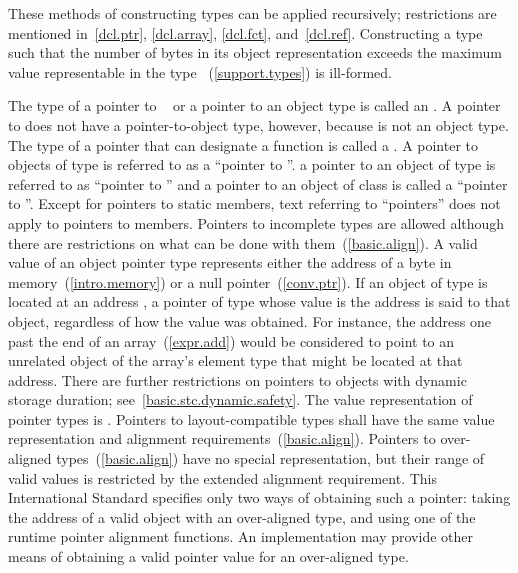 \pnum
These methods of constructing types can be applied recursively;
restrictions are mentioned in~\ref{dcl.ptr}, \ref{dcl.array},
\ref{dcl.fct}, and~\ref{dcl.ref}. Constructing a type such that the number of
bytes in its object representation exceeds the maximum value representable in
the type ~(\ref{support.types}) is ill-formed.

\pnum
{}%
The type of a pointer to \cv\  or a pointer to an object type is
called an . \enternote A pointer to 
does not have a pointer-to-object type, however, because  is not
an object type. \exitnote The type of a pointer that can designate a function
is called a .
A pointer to objects of type  is referred to as a ``pointer to
''. \enterexample a pointer to an object of type  is
referred to as ``pointer to  '' and a pointer to an object of
class  is called a ``pointer to ''. \exitexample
Except for pointers to static members, text referring to ``pointers''
does not apply to pointers to members. Pointers to incomplete types are
allowed although there are restrictions on what can be done with
them~(\ref{basic.align}).
%
A valid value of an object
pointer type represents either the address of a byte in
memory~(\ref{intro.memory}) or a null pointer~(\ref{conv.ptr}). If an
object of type  is located at an address , a pointer
of type   whose value is the address  is
said to  that object, regardless of how the value was
obtained. \enternote For instance, the address one past the end of an
array~(\ref{expr.add}) would be considered to point to an unrelated
object of the array's element type that might be located at that
address. There are further restrictions on pointers to objects with dynamic storage
duration; see~\ref{basic.stc.dynamic.safety}. \exitnote The value representation of
pointer types is . Pointers to
layout-compatible types shall
have the same value representation and alignment
requirements~(\ref{basic.align}).
\enternote Pointers to over-aligned types~(\ref{basic.align}) have no special
representation, but their range of valid values is restricted by the extended
alignment requirement. This International Standard specifies only two ways
of obtaining such a pointer: taking the address of a valid object with
an over-aligned type, and using one of the runtime pointer alignment functions.
An implementation may provide other means of obtaining a valid pointer value
for an over-aligned type.\exitnote

